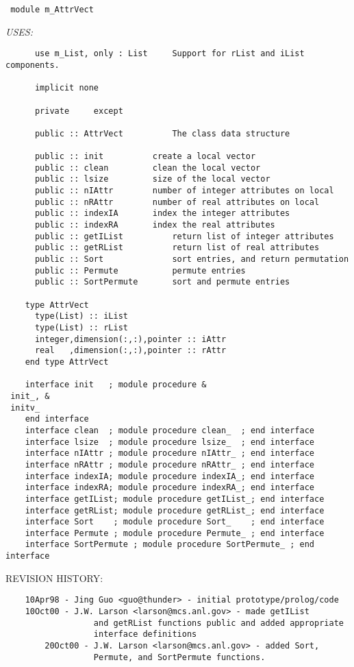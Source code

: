\begin{verbatim} 
 module m_AttrVect\end{verbatim}{\em USES:}
\begin{verbatim}      use m_List, only : List     Support for rList and iList components.
 
      implicit none
 
      private	  except
 
      public :: AttrVect          The class data structure
 
      public :: init		  create a local vector
      public :: clean		  clean the local vector
      public :: lsize		  size of the local vector
      public :: nIAttr		  number of integer attributes on local
      public :: nRAttr		  number of real attributes on local
      public :: indexIA		  index the integer attributes
      public :: indexRA		  index the real attributes
      public :: getIList          return list of integer attributes
      public :: getRList          return list of real attributes
      public :: Sort              sort entries, and return permutation
      public :: Permute           permute entries
      public :: SortPermute       sort and permute entries
 
    type AttrVect
      type(List) :: iList
      type(List) :: rList
      integer,dimension(:,:),pointer :: iAttr
      real   ,dimension(:,:),pointer :: rAttr
    end type AttrVect
 
    interface init   ; module procedure	&
 init_,	&
 initv_
    end interface
    interface clean  ; module procedure clean_  ; end interface
    interface lsize  ; module procedure lsize_  ; end interface
    interface nIAttr ; module procedure nIAttr_ ; end interface
    interface nRAttr ; module procedure nRAttr_ ; end interface
    interface indexIA; module procedure indexIA_; end interface
    interface indexRA; module procedure indexRA_; end interface
    interface getIList; module procedure getIList_; end interface
    interface getRList; module procedure getRList_; end interface
    interface Sort    ; module procedure Sort_    ; end interface
    interface Permute ; module procedure Permute_ ; end interface
    interface SortPermute ; module procedure SortPermute_ ; end interface
 \end{verbatim}{\sf REVISION HISTORY:}
\begin{verbatim}  	10Apr98 - Jing Guo <guo@thunder> - initial prototype/prolog/code
  	10Oct00 - J.W. Larson <larson@mcs.anl.gov> - made getIList
                  and getRList functions public and added appropriate
                  interface definitions
        20Oct00 - J.W. Larson <larson@mcs.anl.gov> - added Sort, 
                  Permute, and SortPermute functions.\end{verbatim}
 
